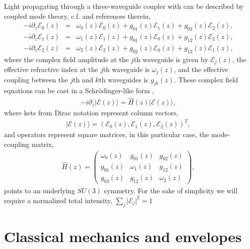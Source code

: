\documentclass[9pt,twocolumn,twoside]{osajnl}
\begin{document}
Light propagating through a three-waveguide coupler with can be described by coupled mode theory, c.f. \cite{RodriguezLara2015p068014} and references therein,
\begin{eqnarray}
-i \partial_{z} \mathcal{E}_{0}(z) &=& \omega_{0}(z) \mathcal{E}_{0}(z) +   g_{01}(z) \mathcal{E}_{1}(z) + g_{02}(z) \mathcal{E}_{2}(z), \\
 -i \partial_{z} \mathcal{E}_{1}(z) &=& \omega_{1}(z) \mathcal{E}_{1}(z) + g_{01}(z) \mathcal{E}_{0}(z) + g_{12}(z) \mathcal{E}_{2}(z), \\
 -i \partial_{z} \mathcal{E}_{2}(z) &=& \omega_{2}(z) \mathcal{E}_{2}(z) + g_{02}(z) \mathcal{E}_{0}(z) + g_{12}(z) \mathcal{E}_{1}(z),
\end{eqnarray}
where the complex field amplitude at the $j$th waveguide is given by $\mathcal{E}_{j}(z)$, the effective refractive index at the $j$th waveguide is $\omega_{j}(z)$, and the effective coupling between the $j$th and $k$th waveguides is $g_{jk}(z)$.
These complex field equations can be cast in a Schr\"odinger-like form \cite{RodriguezLara2015p068014},
\begin{eqnarray}
- i \partial_{z} \vert \mathcal{E}(z) \rangle = \hat{H}(z) \vert \mathcal{E}(z) \rangle,\label{eq:diff}
\end{eqnarray}
where kets from Dirac notation represent column vectors,
\begin{eqnarray}
\vert \mathcal{E}(z) \rangle = \left( \mathcal{E}_{0}(z), \mathcal{E}_{1}(z), \mathcal{E}_{2}(z) \right)^{T}, 
\end{eqnarray}
and operators represent square matrices, in this particular case, the mode-coupling matrix,
\begin{eqnarray}
\hat{H}(z) = \left( \begin{array}{ccc} 
\omega_{0}(z)  & g_{01}(z) & g_{02}(z) \\
g_{01}(z) & \omega_{1}(z) & g_{12}(z) \\
g_{02}(z) & g_{12}(z) & \omega_{2}(z)
\end{array} \right), \label{eq:hmlt}
\end{eqnarray}
points to an underlying $SU(3)$ symmetry.
For the sake of simplicity we will require a normalized total intensity, $\sum_{j} \vert \mathcal{E}_{j} \vert^2 =1$


\section{Classical mechanics and envelopes}
\end{document}

